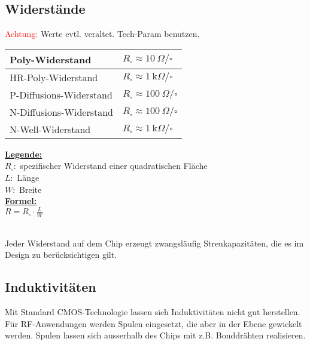 \subsection{Widerstände}
\begin{minipage}[c]{0.45\textwidth}
\textcolor{red}{Achtung:} Werte evtl. veraltet. Tech-Param benutzen.\\
	\begin{tabular}{|l|l|}
		\hline
		Poly-Widerstand & $R_\square \approx \SI{10}{\Omega \per}\square$\\ \hline
		HR-Poly-Widerstand & $R_\square \approx \SI{1}{\kilo\Omega \per}\square$\\ \hline
		P-Diffusions-Widerstand & $R_\square \approx \SI{100}{\Omega \per}\square$\\ \hline
		N-Diffusions-Widerstand & $R_\square \approx \SI{100}{\Omega \per}\square$\\ \hline
		N-Well-Widerstand & $R_\square \approx \SI{1}{\kilo\Omega \per}\square$\\ \hline
	\end{tabular}
\end{minipage}
\begin{minipage}[c]{0.55\textwidth}
	\uline{\textbf{Legende:}}\\
	$R_\square:$ spezifischer Widerstand einer quadratischen Fläche\\
	$L:$ Länge \\
	$W:$ Breite \\
	\uline{\textbf{Formel:}}\\
	$R = R_\square \cdot \frac{L}{W}$
\end{minipage}
\\[1ex]
Jeder Widerstand auf dem Chip erzeugt zwangsläufig Streukapazitäten, die es im Design zu berücksichtigen gilt.

\subsection{Induktivitäten}
Mit Standard CMOS-Technologie lassen sich Induktivitäten nicht gut herstellen.
Für RF-Anwendungen werden Spulen eingesetzt, die aber in der Ebene gewickelt werden.
Spulen lassen sich ausserhalb des Chips mit z.B. Bonddrähten realisieren.